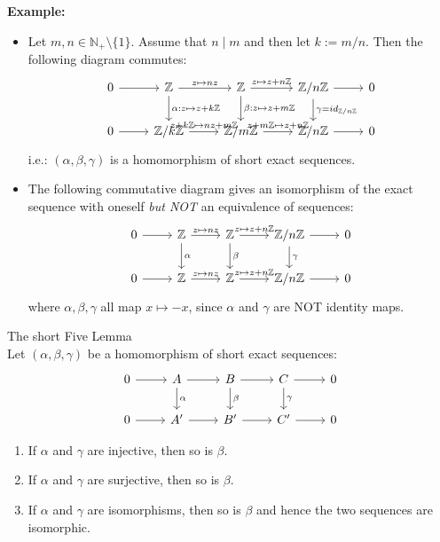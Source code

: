 \noindent\textbf{Example:} \begin{itemize}
    \item Let $m,n \in \mathbb{N}_+ \setminus \{1\}$. Assume that $n \mid m$ and then let $k:= m/n$. Then the following diagram commutes:
    \[
    \begin{tikzcd}
    0 \arrow[r] & \mathbb{Z} \arrow[r, "z \mapsto nz"] \arrow[d, "\alpha: z \mapsto z+k\mathbb{Z}"] & \mathbb{Z} \arrow[r, "z \mapsto z+n\mathbb{Z}"] \arrow[d, "\beta: z\mapsto z+m\mathbb{Z}"] & \mathbb{Z}/ n\mathbb{Z} \arrow[r] \arrow[d, "\gamma= id_{\mathbb{Z}/ n\mathbb{Z}}"] & 0 \\
    0 \arrow[r] & \mathbb{Z}/k \mathbb{Z} \arrow[r, "z+k \mathbb{Z} \mapsto nz+ m\mathbb{Z}"]                    & \mathbb{Z}/ m\mathbb{Z} \arrow[r, "z+m\mathbb{Z} \mapsto z+ n\mathbb{Z}"]                   & \mathbb{Z} /n\mathbb{Z} \arrow[r]                    & 0
    \end{tikzcd}
    \]
    i.e.: $(\alpha, \beta ,\gamma)$ is a homomorphism of short exact sequences.

    \item The following commutative diagram gives an isomorphism of the exact sequence with oneself \textit{but NOT} an equivalence of sequences:
    \[
    \begin{tikzcd}
    0 \arrow[r] & \mathbb{Z} \arrow[r, "z \mapsto nz"] \arrow[d, "\alpha"] & \mathbb{Z} \arrow[r, "z \mapsto z+n\mathbb{Z}"] \arrow[d, "\beta"] & \mathbb{Z}/ n\mathbb{Z} \arrow[r] \arrow[d, "\gamma"] & 0 \\
    0 \arrow[r] & \mathbb{Z} \arrow[r, "z \mapsto nz"]                    & \mathbb{Z} \arrow[r, "z \mapsto z+ n\mathbb{Z}"]                   & \mathbb{Z} /n\mathbb{Z} \arrow[r]                    & 0
    \end{tikzcd}
    \]
    where $\alpha,\beta,\gamma$ all map $x \mapsto -x$, since $\alpha$ and $\gamma$ are NOT identity maps.
\end{itemize}

\begin{theorem}{The short Five Lemma}\\
Let $(\alpha ,\beta ,\gamma)$ be a homomorphism of short exact sequences:
\[
\begin{tikzcd}
0 \arrow[r] & A \arrow[r] \arrow[d, "\alpha"] & B \arrow[r] \arrow[d, "\beta"] & C \arrow[r] \arrow[d, "\gamma"] & 0 \\
0 \arrow[r] & A' \arrow[r]                    & B' \arrow[r]                   & C' \arrow[r]                    & 0
\end{tikzcd}
\]
\begin{enumerate}
    \item If $\alpha$ and $\gamma$ are injective, then so is $\beta$.
    \item If $\alpha$ and $\gamma$ are surjective, then so is $\beta$.
    \item If $\alpha$ and $\gamma$ are isomorphisms, then so is $\beta$ and hence the two sequences are isomorphic.
\end{enumerate}
\end{theorem}


